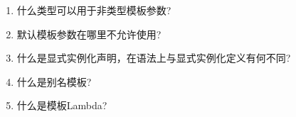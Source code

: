 \begin{enumerate}
\item
什么类型可以用于非类型模板参数?

\item
默认模板参数在哪里不允许使用?

\item
什么是显式实例化声明，在语法上与显式实例化定义有何不同?

\item
什么是别名模板?

\item
什么是模板Lambda?
\end{enumerate}